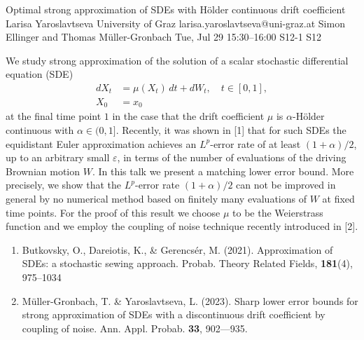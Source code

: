 \begin{talk}
  {Optimal strong approximation of SDEs with H\"older continuous drift coefficient}%
  {Larisa Yaroslavtseva}%
  {University of Graz}%
  {larisa.yaroslavtseva@uni-graz.at}%
  {Simon Ellinger and Thomas M\"uller-Gronbach}%
  {}%
  {Tue, Jul 29 15:30--16:00}%
  {S12-1}%
  {S12}%
  
    
   
We study strong approximation of the solution of a scalar stochastic differential equation (SDE)
\begin{equation}\label{sde0}
 \begin{aligned}
  dX_t & = \mu(X_t) \, dt +  dW_t, \quad t\in [0,1],\\
  X_0 & = x_0
 \end{aligned}
\end{equation}
at the final time point $1$
in the case that  the drift coefficient  $\mu$ is $\alpha$-H\"older continuous with $\alpha\in(0, 1]$.
Recently, it was  shown in [1] that for such SDEs the equidistant Euler approximation achieves an $L^p$-error rate of at least $(1+\alpha)/2$, up to an arbitrary small $\varepsilon$,
in terms of the number of evaluations of the driving Brownian motion $W$.
In this talk  we  
present a matching  lower error bound.   More precisely, we show that
the $L^p$-error rate $(1+\alpha)/2$ can
not be improved in general by  no numerical 
method based on finitely many evaluations of $W$ at fixed time points. For the proof of this result we choose  $\mu$ to be the Weierstrass function and we employ  the coupling of noise technique  recently introduced in [2].




\begin{enumerate}
 \item[{[1]}] Butkovsky, O., Dareiotis, K., \& Gerencs\'er, M. (2021). Approximation of SDEs: a stochastic sewing approach. Probab. Theory Related Fields, \textbf{181}(4), 975--1034
 \item[{[2]}] M\"uller-Gronbach, T.  \& Yaroslavtseva, L. (2023). Sharp lower error bounds for strong approximation of
 SDEs with a discontinuous drift coefficient by coupling of noise. Ann. Appl. Probab. \textbf{33}, 902---935.
\end{enumerate}


\end{talk}


